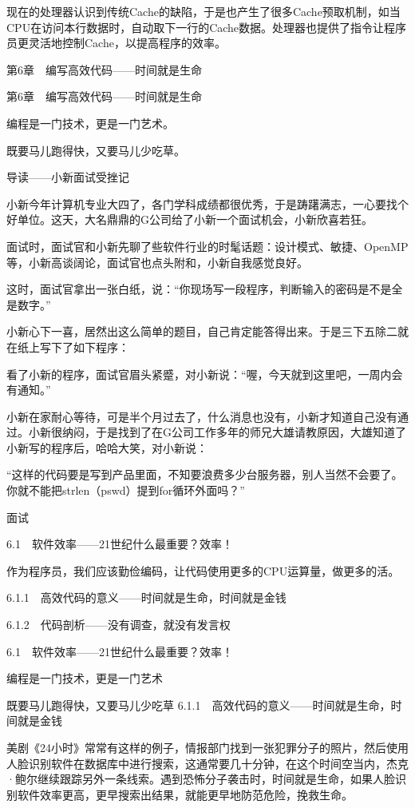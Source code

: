 \documentclass[12pt,UTF8]{ctexbook}
\begin{document}
现在的处理器认识到传统Cache的缺陷，于是也产生了很多Cache预取机制，如当CPU在访问本行数据时，自动取下一行的Cache数据。处理器也提供了指令让程序员更灵活地控制Cache，以提高程序的效率。


第6章　编写高效代码——时间就是生命


第6章　编写高效代码——时间就是生命

编程是一门技术，更是一门艺术。

既要马儿跑得快，又要马儿少吃草。



导读——小新面试受挫记

小新今年计算机专业大四了，各门学科成绩都很优秀，于是踌躇满志，一心要找个好单位。这天，大名鼎鼎的G公司给了小新一个面试机会，小新欣喜若狂。

面试时，面试官和小新先聊了些软件行业的时髦话题：设计模式、敏捷、OpenMP等，小新高谈阔论，面试官也点头附和，小新自我感觉良好。

这时，面试官拿出一张白纸，说：“你现场写一段程序，判断输入的密码是不是全是数字。”

小新心下一喜，居然出这么简单的题目，自己肯定能答得出来。于是三下五除二就在纸上写下了如下程序：

看了小新的程序，面试官眉头紧蹙，对小新说：“喔，今天就到这里吧，一周内会有通知。”

小新在家耐心等待，可是半个月过去了，什么消息也没有，小新才知道自己没有通过。小新很纳闷，于是找到了在G公司工作多年的师兄大雄请教原因，大雄知道了小新写的程序后，哈哈大笑，对小新说：

“这样的代码要是写到产品里面，不知要浪费多少台服务器，别人当然不会要了。你就不能把strlen（pswd）提到for循环外面吗？”

面试


6.1　软件效率——21世纪什么最重要？效率！

作为程序员，我们应该勤俭编码，让代码使用更多的CPU运算量，做更多的活。

6.1.1　高效代码的意义——时间就是生命，时间就是金钱

6.1.2　代码剖析——没有调查，就没有发言权


6.1　软件效率——21世纪什么最重要？效率！

编程是一门技术，更是一门艺术

既要马儿跑得快，又要马儿少吃草
6.1.1　高效代码的意义——时间就是生命，时间就是金钱

美剧《24小时》常常有这样的例子，情报部门找到一张犯罪分子的照片，然后使用人脸识别软件在数据库中进行搜索，这通常要几十分钟，在这个时间空当内，杰克·鲍尔继续跟踪另外一条线索。遇到恐怖分子袭击时，时间就是生命，如果人脸识别软件效率更高，更早搜索出结果，就能更早地防范危险，挽救生命。
\end{document}
